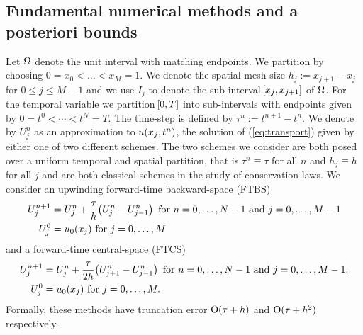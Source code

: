 \documentclass[final]{amsart}
\numberwithin{equation}{section}
\begin{document}
\subsection{Fundamental numerical methods and a posteriori bounds}\label{sec:example_aposteriori_bounds}

Let $\Omega$ denote the unit interval with matching endpoints. We
partition by choosing $0=x_0< \dots < x_{M}=1$. We denote the spatial
mesh size $ h_j := x_{j+1} - x_{j}$ for $0\leq j\leq M-1$ and we use
$I_j$ to denote the sub-interval $\!\left[{x_{j},x_{j+1}}\right]$ of $\Omega$. For the
temporal variable we partition $\!\left[{0,T}\right]$ into sub-intervals with
endpoints given by $0=t^0<\cdots<t^N=T$.  The time-step is defined by
$\tau^n:=t^{n+1}-t^n$. We denote by $U^n_j$ as an approximation to $
u\!\left({x_j, t^n}\right)$, the solution of (\ref{eq:transport}) given by either
one of two different schemes. The two schemes we consider are both
posed over a uniform temporal and spatial partition, that is $\tau^n
\equiv \tau$ for all $n$ and $h_j\equiv h$ for all $j$ and are both
classical schemes in the study of conservation laws. We consider an
upwinding forward-time backward-space (FTBS)
\begin{equation}
\label{eq:FTBS}
\begin{split}
U^{n+1}_j &= U^n_j + \frac{\tau}{h} \!\left({U^n_{j} - U^n_{j-1}}\right)
\text{ for } n=0,\dots, N-1 \text{ and } j=0,\dots, M-1
\\
U^0_j &= u_0(x_j) \text{ for } j=0, \dots, M
\end{split}
\end{equation}
and a forward-time central-space (FTCS)
\begin{equation}
\label{eq:FTCS}
\begin{split}
U^{n+1}_j &= U^n_j + \frac{\tau}{2h}
\!\left({U^n_{j+1}-U^n_{j-1}}\right)
\text{ for } n=0,\dots, N-1 \text{ and } j=0,\dots, M-1.
\\
U^0_j &= u_0(x_j) \text{ for } j=0, \dots, M.
\end{split}
\end{equation}
Formally, these methods have truncation error $\operatorname{O}(\tau + h)$ and
$\operatorname{O}(\tau + h^2)$ respectively.
\end{document}
